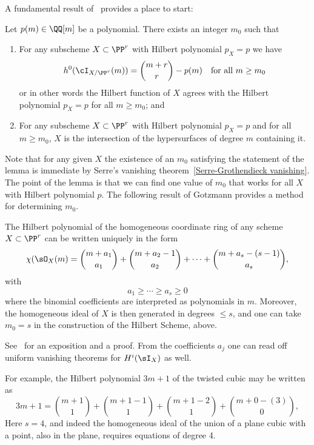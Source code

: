 A fundamental result of~\cite{Matsusaka} provides a place to start:

\begin{lemma}\label{matsusaka}
Let $p(m) \in \QQ[m]$ be a polynomial. There exists an integer $m_0$ such that

\begin{enumerate}  

\item For any subscheme $X \subset \PP^r$ with Hilbert polynomial $p_X = p$ we have
$$
h^0(\cI_{X/\PP^r}(m)) = \binom{m+r}{r} - p(m) \quad \text{for all } m \geq m_0
$$
or in other words the Hilbert function of $X$ agrees with the Hilbert polynomial $p_X = p$ for all $m \geq m_0$; and

\item For any subscheme $X \subset \PP^r$ with Hilbert polynomial $p_X = p$ and for all $m \geq m_0$, $X$ is the intersection of the hypersurfaces of degree $m$ containing it.
\end{enumerate}
\end{lemma}
Note that  for any given $X$ the existence of an $m_0$ satisfying the statement of the lemma is immediate by Serre's vanishing theorem~\ref{Serre-Grothendieck vanishing}. The point of the lemma is that we can find one value of $m_0$ that works for all $X$ with Hilbert polynomial $p$. The following result of Gotzmann provides a method for determining $m_0$. 

\begin{theorem}
The Hilbert polynomial  of the homogeneous coordinate ring of any scheme $X\subset \PP^r$ can be written uniquely in the form
$$
\chi(\sO_X(m) = {m+a_1\choose a_1}+ {m+a_2 -1\choose a_2}+ \cdots+{m+a_s -(s-1)\choose a_s},
$$
with 
$$
a_1\geq \cdots \geq a_s \geq 0
$$
where the binomial coefficients are interpreted as polynomials in $m$. Moreover, the homogeneous ideal of $X$ is
then generated in degrees $\leq s$, and one can take $m_0 = s$ in the construction of the Hilbert Scheme, above.
\end{theorem}
See~\cite{MR1023391} %
for an exposition and a proof. From the coefficients $a_j$ one can read off uniform vanishing theorems for $H^i(\sI_X)$
 as well.
 
 For example, the Hilbert polynomial $3m+1$ of the twisted cubic may be written as
 $$
 3m+1 =  {m+1\choose 1}+ {m+1 -1\choose 1}+{m+1 -2\choose 1}+{m+0 -(3)\choose 0},
 $$
 Here $s=4$, and indeed the homogeneous ideal of the union of a plane cubic with a point, also in the plane,
 requires equations of degree 4.
 
